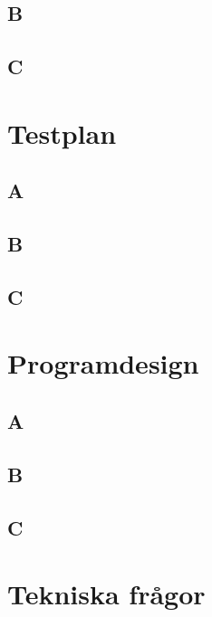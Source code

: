 \documentclass[a4paper, 11pt]{article}
\begin{document}
\subsection{B}


\subsection{C}


\section{Testplan}
\label{sec:testplan}

\subsection{A}


\subsection{B}


\subsection{C}


\section{Programdesign}
\label{sec:design}

\subsection{A}


\subsection{B}


\subsection{C}


\section{Tekniska frågor}
\label{sec:qa}
\end{document}
